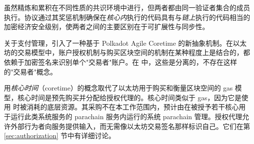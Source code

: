 虽然精炼和累积在不同性质的共识环境中进行，但两者都由同一验证者集合的成员执行。\Jam 协议通过其奖惩机制确保在\emph{核心内}执行的代码具有与\emph{链上}执行的代码相当的加密经济安全级别，使两者之间的主要区别在于可扩展性与同步性。

关于支付管理，\Jam 引入了一种基于 Polkadot Agile Coretime 的新抽象机制。在以太坊的交易模型中，账户授权机制与购买区块空间的机制在某种程度上是结合的，都依赖于加密签名来识别单个"交易者"账户。在 \Jam 中，这些是分离的，不存在这样的"交易者"概念。

\Jam 用\emph{核心时间}（coretime）的概念取代了以太坊用于购买和衡量区块空间的 gas 模型，核心时间是预先购买并分配给授权代理的。核心时间类似于 gas，因为它是使用 \Jam 时被消耗的底层资源。其采购不在本工作范围内，预计由在被授予若干核心用于运行此类系统服务的 parachain 服务内运行的系统 parachain 管理。授权代理允许外部行为者向服务提供输入，而无需像以太坊交易签名那样标识自己。它们在第 \ref{sec:authorization} 节中有详细讨论。

